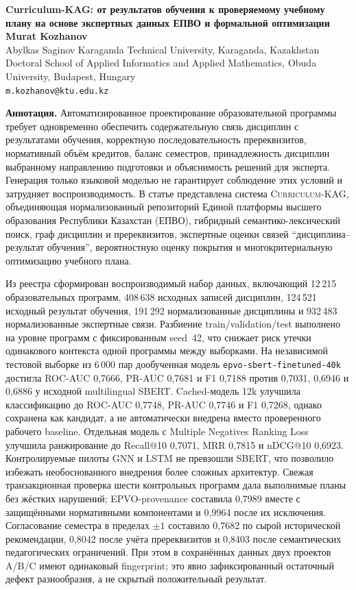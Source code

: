 \documentclass[twoside,11pt]{article}
\newcommand{\systemname}{\textsc{Curriculum-KAG}}
\begin{document}
\begin{center}
{\Large\bf Curriculum-KAG: от результатов обучения к проверяемому учебному плану на основе экспертных данных ЕПВО и формальной оптимизации}\\[8pt]

{\large\bf Murat Kozhanov}\\[3pt]
Abylkas Saginov Karaganda Technical University, Karaganda, Kazakhstan\\
Doctoral School of Applied Informatics and Applied Mathematics, Obuda University, Budapest, Hungary\\
\texttt{m.kozhanov@ktu.edu.kz}\\[8pt]
\end{center}

\noindent\textbf{Аннотация.}
Автоматизированное проектирование образовательной программы требует одновременно обеспечить содержательную связь дисциплин с результатами обучения, корректную последовательность пререквизитов, нормативный объём кредитов, баланс семестров, принадлежность дисциплин выбранному направлению подготовки и объяснимость решений для эксперта. Генерация только языковой моделью не гарантирует соблюдение этих условий и затрудняет воспроизводимость. В статье представлена система \systemname{}, объединяющая нормализованный репозиторий Единой платформы высшего образования Республики Казахстан (ЕПВО), гибридный семантико-лексический поиск, граф дисциплин и пререквизитов, экспертные оценки связей ``дисциплина--результат обучения'', вероятностную оценку покрытия и многокритериальную оптимизацию учебного плана.

Из реестра сформирован воспроизводимый набор данных, включающий 12\,215 образовательных программ, 408\,638 исходных записей дисциплин, 124\,521 исходный результат обучения, 191\,292 нормализованные дисциплины и 932\,483 нормализованные экспертные связи. Разбиение train/validation/test выполнено на уровне программ с фиксированным seed~42, что снижает риск утечки одинакового контекста одной программы между выборками. На независимой тестовой выборке из 6\,000 пар дообученная модель \texttt{epvo-sbert-finetuned-40k} достигла ROC-AUC 0,7666, PR-AUC 0,7681 и F1 0,7188 против 0,7031, 0,6946 и 0,6886 у исходной multilingual SBERT. Cached-модель 12k улучшила классификацию до ROC-AUC 0,7748, PR-AUC 0,7746 и F1 0,7268, однако сохранена как кандидат, а не автоматически внедрена вместо проверенного рабочего baseline. Отдельная модель с Multiple Negatives Ranking Loss улучшила ранжирование до Recall@10 0,7071, MRR 0,7815 и nDCG@10 0,6923. Контролируемые пилоты GNN и LSTM не превзошли SBERT, что позволило избежать необоснованного внедрения более сложных архитектур. Свежая транзакционная проверка шести контрольных программ дала выполнимые планы без жёстких нарушений; EPVO-provenance составила 0,7989 вместе с защищёнными нормативными компонентами и 0,9964 после их исключения. Согласование семестра в пределах $\pm1$ составило 0,7682 по сырой исторической рекомендации, 0,8042 после учёта пререквизитов и 0,8403 после семантических педагогических ограничений. При этом в сохранённых данных двух проектов A/B/C имеют одинаковый fingerprint; это явно зафиксированный остаточный дефект разнообразия, а не скрытый положительный результат.
\end{document}
